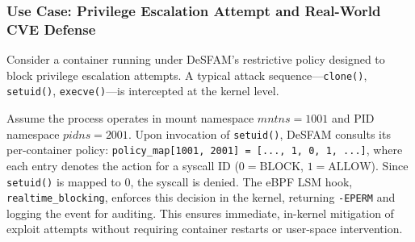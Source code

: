 \subsubsection{Use Case: Privilege Escalation Attempt and Real-World CVE Defense}
\label{subsubsec:usecase}

Consider a container running under DeSFAM's restrictive policy designed to block privilege
escalation attempts. A typical attack sequence---\texttt{clone()}, \texttt{setuid()},
\texttt{execve()}---is intercepted at the kernel level.

Assume the process operates in mount namespace $\mathit{mntns} = 1001$ and PID namespace
$\mathit{pidns} = 2001$. Upon invocation of \texttt{setuid()}, DeSFAM consults its
per-container policy: \texttt{policy\_map[1001, 2001] = [..., 1, 0, 1, ...]}, where each entry
denotes the action for a syscall ID ($0 = \text{BLOCK}$, $1 = \text{ALLOW}$). Since
\texttt{setuid()} is mapped to 0, the syscall is denied. The eBPF LSM hook,
\texttt{realtime\_blocking}, enforces this decision in the kernel, returning \texttt{-EPERM}
and logging the event for auditing. This ensures immediate, in-kernel mitigation of exploit
attempts without requiring container restarts or user-space intervention.
